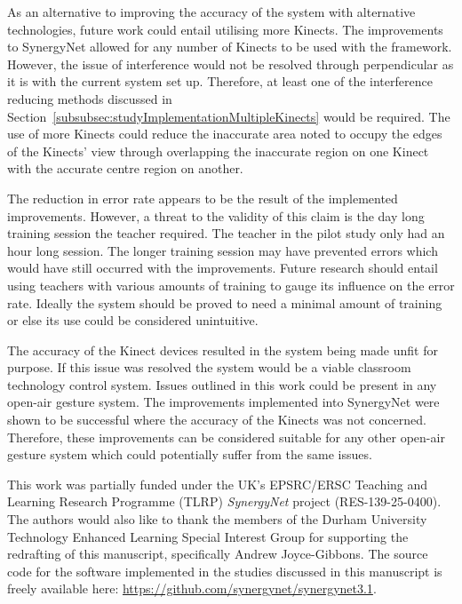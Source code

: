 \documentclass[link]{IWCOMP}
\begin{document}
As an alternative to improving the accuracy of the system with alternative technologies, future work could entail utilising more Kinects.
The improvements to SynergyNet allowed for any number of Kinects to be used with the framework.
However, the issue of interference would not be resolved through perpendicular as it is with the current system set up.
Therefore, at least one of the interference reducing methods discussed in Section~\ref{subsubsec:studyImplementationMultipleKinects} would be required.
The use of more Kinects could reduce the inaccurate area noted to occupy the edges of the Kinects' view through overlapping the inaccurate region on one Kinect with the accurate centre region on another.

The reduction in error rate appears to be the result of the implemented improvements.
However, a threat to the validity of this claim is the day long training session the teacher required.
The teacher in the pilot study only had an hour long session.
The longer training session may have prevented errors which would have still occurred with the improvements.
Future research should entail using teachers with various amounts of training to gauge its influence on the error rate.
Ideally the system should be proved to need a minimal amount of training or else its use could be considered unintuitive.

The accuracy of the Kinect devices resulted in the system being made unfit for purpose.
If this issue was resolved the system would be a viable classroom technology control system.
Issues outlined in this work could be present in any open-air gesture system.
The improvements implemented into SynergyNet were shown to be successful where the accuracy of the Kinects was not concerned.
Therefore, these improvements can be considered suitable for any other open-air gesture system which could potentially suffer from the same issues.

\begin{ack}

This work was partially funded under the UK's EPSRC/ERSC Teaching and Learning Research Programme (TLRP) {\emph{SynergyNet}} project (RES-139-25-0400).
The authors would also like to thank the members of the Durham University Technology Enhanced Learning Special Interest Group for supporting the redrafting of this manuscript, specifically Andrew Joyce-Gibbons.
The source code for the software implemented in the studies discussed in this manuscript is freely available here: \url{https://github.com/synergynet/synergynet3.1}.

\end{ack}

\makeatletter
\def\@biblabel#1{}
\makeatother



\end{document}
